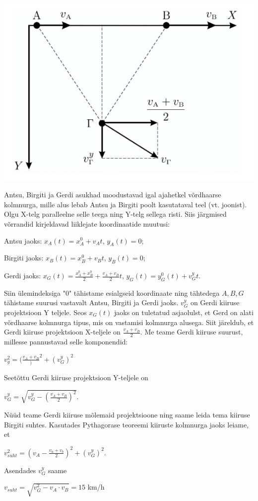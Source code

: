 {\ifSolution
\begin{center}
	\includegraphics[width=0.5\linewidth]{2015-v3p-10-lah.PNG}
\end{center}
Antsu, Birgiti ja Gerdi asukhad moodustavad igal ajahetkel võrdhaarse kolmnurga, mille alus lebab Antsu ja Birgiti poolt kasutataval teel (vt. joonist). 
Olgu X-telg paralleelne selle teega ning Y-telg sellega risti. Siis järgmised võrrandid kirjeldavad liiklejate koordinaatide muutusi:
\begin{center}
Antsu jaoks: $x_A(t) = x_A ^0 + v_At$, $y_A(t) = 0$;
\end{center}
\begin{center}
Birgiti jaoks: $x_B(t) = x_B ^0 + v_Bt$, $y_B(t) = 0$;
\end{center}
\begin{center}
Gerdi jaoks: $x_G(t) = \frac{x_A ^0 + x_B ^0}{2} + \frac{v_A + v_B}{2}t$, $y_G(t) = y_G ^0(t) + v_G ^y t$.
\end{center}
Siin ülemindeksiga "0" tähistame esialgseid koordinaate ning tähtedega $A, B, G$ tähistame suurusi vastavalt Antsu, Birgiti ja Gerdi jaoks. $v_G ^y$ on Gerdi kiiruse projektsioon Y teljele. Seos $x_G(t)$ jaoks on tuletatud asjaolulst, et Gerd on alati võrdhaarse kolmnurga tipus, mis on vastamisi kolmnurga alusega. Siit järeldub, et Gerdi kiiruse projektsioon X-teljele on $\frac{v_A + v_B }{2}$.
Me teame Gerdi kiiruse suurust, millesse pannustavad selle komponendid:
\begin{center}
$v_g ^2 = (\frac{v_A + v_B})^2 + (v_G ^y)^2$ 
\end{center}
Seetõttu Gerdi kiiruse projektsioon Y-teljele on
\begin{center}
$v_G^y =\sqrt{v_G^y - (\frac{v_A + v_B}{2})^2}$.
\end{center}
Nüüd teame Gerdi kiiruse mõlemaid projektsioone ning saame leida tema kiiruse Birgiti suhtes. Kasutades Pythagorase teoreemi kiiruste kolmnurga jaoks leiame, et
\begin{center}
$v_{suht} ^2 = (v_A - \frac{v_a + v_b}{2})^2 + (v_G ^y)^2$.
\end{center}
Asendades $v_G ^y$ saame
\begin{center}
$v_{suht} = \sqrt{v_G ^2 - v_A \cdot v_B } = 15$ km/h
\end{center}
\fi
}